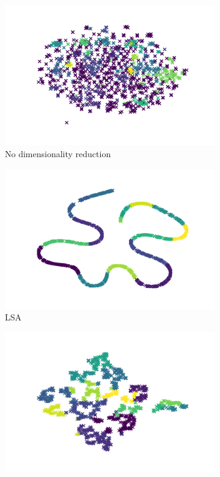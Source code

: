 \begin{figure}
  \centering
  \begin{subfigure}{.3\textwidth}
      \centering
      \includegraphics[width=\linewidth]{imgs/agglomerative.png}
      \caption{No dimensionality reduction}
      \label{fig:agglomerative_no_dim}
  \end{subfigure}
  \begin{subfigure}{.3\textwidth}
    \centering
    \includegraphics[width=\linewidth]{imgs/agglomerative_lsa.png}
    \caption{LSA}
    \label{fig:agglomerative_lsa}
  \end{subfigure}%
  \begin{subfigure}{.3\textwidth}
    \centering
    \includegraphics[width=\linewidth]{imgs/agglomerative_spectral.png}

\end{subfigure}
\end{figure}
